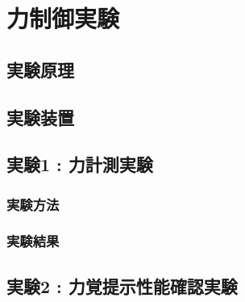 \documentclass[./main]{subfiles}
\begin{document}
\section{力制御実験}
\label{sec: coilcurrent_exp}

\subsection{実験原理}
\label{subsec: coilcurrent_exp-principle}







\subsection{実験装置}
\label{subsec: coilcurrent_exp-apparatus}

\subsection{実験1 : 力計測実験}
\label{subsec: coilcurrent_exp-exp1}

\subsubsection{実験方法}
\label{subsubsec: coilcurrent_exp-exp1-method}

\subsubsection{実験結果}
\label{subsubsec: coilcurrent_exp-exp1-result}

\subsection{実験2 : 力覚提示性能確認実験}
\label{subsec: coilcurrent_exp-exp2}

\end{document}
